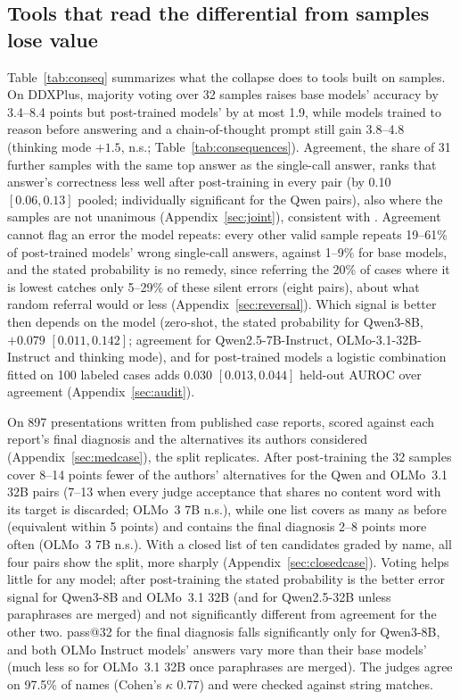\documentclass[wcp]{jmlr}
\begin{document}
\subsection{Tools that read the differential from samples lose value}\label{sec:consequences}\label{sec:medrare}
Table~\ref{tab:conseq} summarizes what the collapse does to tools built on samples. On DDXPlus, majority voting over 32 samples raises base models' accuracy by 3.4--8.4 points but post-trained models' by at most 1.9, while models trained to reason before answering and a chain-of-thought prompt still gain 3.8--4.8 (thinking mode $+1.5$, n.s.; Table~\ref{tab:consequences}). Agreement, the share of 31 further samples with the same top answer as the single-call answer, ranks that answer's correctness less well after post-training in every pair (by 0.10 $[0.06,0.13]$ pooled; individually significant for the Qwen pairs), also where the samples are not unanimous (Appendix~\ref{sec:joint}), consistent with \citet{liu2026alignmenttax}. Agreement cannot flag an error the model repeats: every other valid sample repeats 19--61\% of post-trained models' wrong single-call answers, against 1--9\% for base models, and the stated probability is no remedy, since referring the 20\% of cases where it is lowest catches only 5--29\% of these silent errors (eight pairs), about what random referral would or less (Appendix~\ref{sec:reversal}). Which signal is better then depends on the model (zero-shot, the stated probability for Qwen3-8B, $+0.079$ $[0.011,0.142]$; agreement for Qwen2.5-7B-Instruct, OLMo-3.1-32B-Instruct and thinking mode), and for post-trained models a logistic combination fitted on 100 labeled cases adds 0.030 $[0.013,0.044]$ held-out AUROC over agreement (Appendix~\ref{sec:audit}).

On 897 presentations written from published case reports, scored against each report's final diagnosis and the alternatives its authors considered (Appendix~\ref{sec:medcase}), the split replicates. After post-training the 32 samples cover 8--14 points fewer of the authors' alternatives for the Qwen and OLMo~3.1 32B pairs (7--13 when every judge acceptance that shares no content word with its target is discarded; OLMo~3 7B n.s.), while one list covers as many as before (equivalent within 5 points) and contains the final diagnosis 2--8 points more often (OLMo~3 7B n.s.). With a closed list of ten candidates graded by name, all four pairs show the split, more sharply (Appendix~\ref{sec:closedcase}). Voting helps little for any model; after post-training the stated probability is the better error signal for Qwen3-8B and OLMo~3.1 32B (and for Qwen2.5-32B unless paraphrases are merged) and not significantly different from agreement for the other two. pass@32 for the final diagnosis falls significantly only for Qwen3-8B, and both OLMo Instruct models' answers vary more than their base models' (much less so for OLMo~3.1 32B once paraphrases are merged). The judges agree on 97.5\% of names (Cohen's $\kappa$ 0.77) and were checked against string matches.
\end{document}
